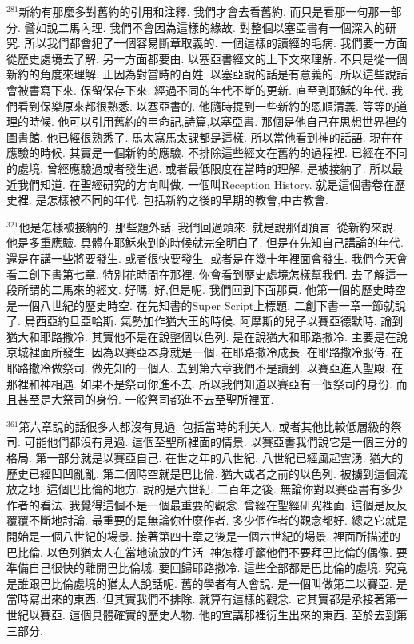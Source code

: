 \documentclass{book}
\begin{document}
$^{281}$新約有那麼多對舊約的引用和注釋.
我們才會去看舊約.
而只是看那一句那一部分.
譬如說二馬內理.
我們不會因為這樣的緣故.
對整個以塞亞書有一個深入的研究.
所以我們都會犯了一個容易斷章取義的.
一個這樣的讀經的毛病.
我們要一方面從歷史處境去了解.
另一方面都要由.
以塞亞書經文的上下文來理解.
不只是從一個新約的角度來理解.
正因為對當時的百姓.
以塞亞說的話是有意義的.
所以這些說話會被書寫下來.
保留保存下來.
經過不同的年代不斷的更新.
直至到耶穌的年代.
我們看到保樂原來都很熟悉.
以塞亞書的.
他隨時提到一些新約的恩順清義.
等等的道理的時候.
他可以引用舊約的申命記,詩篇,以塞亞書.
那個是他自己在思想世界裡的圖書館.
他已經很熟悉了.
馬太寫馬太課都是這樣.
所以當他看到神的話語.
現在在應驗的時候.
其實是一個新約的應驗.
不排除這些經文在舊約的過程裡.
已經在不同的處境.
曾經應驗過或者發生過.
或者最低限度在當時的理解.
是被接納了.
所以最近我們知道.
在聖經研究的方向叫做.
一個叫Reception History.
就是這個書卷在歷史裡.
是怎樣被不同的年代.
包括新約之後的早期的教會,中古教會.

$^{321}$他是怎樣被接納的.
那些題外話.
我們回過頭來.
就是說那個預言.
從新約來說.
他是多重應驗.
具體在耶穌來到的時候就完全明白了.
但是在先知自己講論的年代.
還是在講一些將要發生.
或者很快要發生.
或者是在幾十年裡面會發生.
我們今天會看二創下書第七章.
特別花時間在那裡.
你會看到歷史處境怎樣幫我們.
去了解這一段所謂的二馬來的經文.
好嗎.
好,但是呢.
我們回到下面那頁.
他第一個的歷史時空是一個八世紀的歷史時空.
在先知書的Super Script上標題.
二創下書一章一節就說了.
烏西亞約旦亞哈斯.
氣勢加作猶大王的時候.
阿摩斯的兒子以賽亞德默時.
論到猶大和耶路撒冷.
其實他不是在說整個以色列.
是在說猶大和耶路撒冷.
主要是在說京城裡面所發生.
因為以賽亞本身就是一個.
在耶路撒冷成長.
在耶路撒冷服侍.
在耶路撒冷做祭司.
做先知的一個人.
去到第六章我們不是讀到.
以賽亞進入聖殿.
在那裡和神相遇.
如果不是祭司你進不去.
所以我們知道以賽亞有一個祭司的身份.
而且甚至是大祭司的身份.
一般祭司都進不去至聖所裡面.

$^{361}$第六章說的話很多人都沒有見過.
包括當時的利美人.
或者其他比較低層級的祭司.
可能他們都沒有見過.
這個至聖所裡面的情景.
以賽亞書我們說它是一個三分的格局.
第一部分就是以賽亞自己.
在世之年的八世紀.
八世紀已經風起雲湧.
猶大的歷史已經凹凹亂亂.
第二個時空就是巴比倫.
猶大或者之前的以色列.
被擄到這個流放之地.
這個巴比倫的地方.
說的是六世紀.
二百年之後.
無論你對以賽亞書有多少作者的看法.
我覺得這個不是一個最重要的觀念.
曾經在聖經研究裡面.
這個是反反覆覆不斷地討論.
最重要的是無論你什麼作者.
多少個作者的觀念都好.
總之它就是開始是一個八世紀的場景.
接著第四十章之後是一個六世紀的場景.
裡面所描述的巴比倫.
以色列猶太人在當地流放的生活.
神怎樣呼籲他們不要拜巴比倫的偶像.
要準備自己很快的離開巴比倫城.
要回歸耶路撒冷.
這些全部都是巴比倫的處境.
究竟是誰跟巴比倫處境的猶太人說話呢.
舊的學者有人會說.
是一個叫做第二以賽亞.
是當時寫出來的東西.
但其實我們不排除.
就算有這樣的觀念.
它其實都是承接著第一世紀以賽亞.
這個具體確實的歷史人物.
他的宣講那裡衍生出來的東西.
至於去到第三部分.
\end{document}
